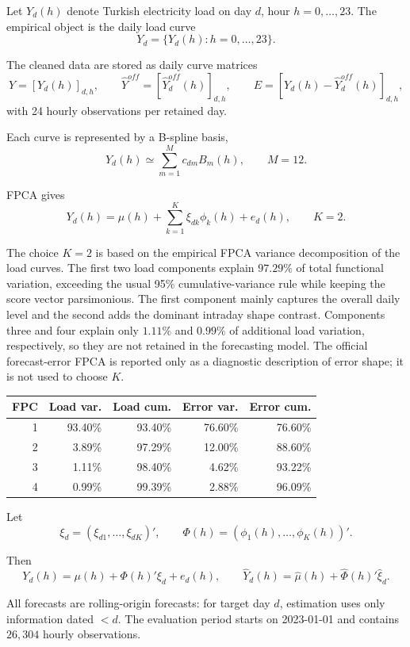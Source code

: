 \documentclass[10pt,a4paper]{article}
\begin{document}
Let \(Y_d(h)\) denote Turkish electricity load on day \(d\), hour \(h=0,\ldots,23\).  
The empirical object is the daily load curve
\[
Y_d=\{Y_d(h):h=0,\ldots,23\}.
\]

The cleaned data are stored as daily curve matrices
\[
Y=[Y_d(h)]_{d,h}, \qquad
\widehat Y^{off}=[\widehat Y^{off}_d(h)]_{d,h}, \qquad
E=[Y_d(h)-\widehat Y^{off}_d(h)]_{d,h},
\]
with 24 hourly observations per retained day.

Each curve is represented by a B-spline basis,
\[
Y_d(h)\simeq \sum_{m=1}^{M}c_{dm}B_m(h),
\qquad M=12.
\]

FPCA gives
\[
Y_d(h)=\mu(h)+\sum_{k=1}^{K}\xi_{dk}\phi_k(h)+e_d(h),
\qquad K=2.
\]

The choice \(K=2\) is based on the empirical FPCA variance decomposition of the
load curves. The first two load components explain \(97.29\%\) of total functional
variation, exceeding the usual 95\% cumulative-variance rule while keeping the
score vector parsimonious. The first component mainly captures the overall daily
level and the second adds the dominant intraday shape contrast. Components three
and four explain only \(1.11\%\) and \(0.99\%\) of additional load variation,
respectively, so they are not retained in the forecasting model. The official
forecast-error FPCA is reported only as a diagnostic description of error shape; it
is not used to choose \(K\).

\begin{center}
\fontsize{8.4}{9.6}\selectfont
\begin{tabular}{rrrrr}
\hline
FPC & Load var. & Load cum. & Error var. & Error cum.\\
\hline
1 & 93.40\% & 93.40\% & 76.60\% & 76.60\%\\
2 & 3.89\% & 97.29\% & 12.00\% & 88.60\%\\
3 & 1.11\% & 98.40\% & 4.62\% & 93.22\%\\
4 & 0.99\% & 99.39\% & 2.88\% & 96.09\%\\
\hline
\end{tabular}
\end{center}

\fontsize{9.2}{10.8}\selectfont

Let
\[
\xi_d=(\xi_{d1},\ldots,\xi_{dK})',
\qquad
\Phi(h)=(\phi_1(h),\ldots,\phi_K(h))'.
\]

Then
\[
Y_d(h)=\mu(h)+\Phi(h)'\xi_d+e_d(h),
\qquad
\widehat Y_d(h)=\widehat\mu(h)+\widehat{\Phi}(h)'\widehat\xi_d.
\]

All forecasts are rolling-origin forecasts: for target day \(d\), estimation uses only information dated \(<d\). The evaluation period starts on 2023-01-01 and contains \(26{,}304\) hourly observations.
\end{document}
